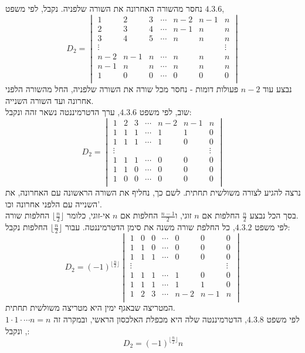 \documentclass{article}
\begin{document}
נחסר מהשורה האחרונה את השורה שלפניה. נקבל, לפי משפט $4.3.6$,
\[
    D_2 = \begin{vmatrix}
        1      & 2   & 3 & \cdots & n-2 & n-1 & n      \\
        2      & 3   & 4 & \cdots & n-1 & n   & n      \\
        3      & 4   & 5 & \cdots & n   & n   & n      \\
        \vdots &     &   &        &     &     & \vdots \\
        n-2    & n-1 & n & \cdots & n   & n   & n      \\
        n-1    & n   & n & \cdots & n   & n   & n      \\
        1      & 0   & 0 & \cdots & 0   & 0   & 0      \\
    \end{vmatrix}
\]
נבצע עוד $n-2$
פעולות דומות - נחסר מכל שורה את השורה שלפניה,
החל מהשורה הלפני אחרונה ועד השורה השנייה. \\
שוב, לפי משפט $4.3.6$,
ערך הדטרמיננטה נשאר זהה ונקבל:
\[
    D_2 = \begin{vmatrix}
        1      & 2 & 3 & \cdots & n-2 & n-1 & n      \\
        1      & 1 & 1 & \cdots & 1   & 1   & 0      \\
        1      & 1 & 1 & \cdots & 1   & 0   & 0      \\
        \vdots &   &   &        &     &     & \vdots \\
        1      & 1 & 1 & \cdots & 0   & 0   & 0      \\
        1      & 1 & 0 & \cdots & 0   & 0   & 0      \\
        1      & 0 & 0 & \cdots & 0   & 0   & 0      \\
    \end{vmatrix}
\]
נרצה להגיע לצורה משולשית תחתית.
לשם כך, נחליף את השורה הראשונה עם האחרונה, את השנייה עם הלפני אחרונה וכו'. \\
בסך הכל נבצע $\frac n 2$ החלפות אם $n$ זוגי,
ו$\frac{n-1}{2}$ החלפות אם $n$ אי-זוגי,
כלומר $\lfloor \frac n 2 \rfloor$ החלפות שורה. \\
לפי משפט $4.3.2$,
כל החלפת שורה משנה את סימן הדטרמיננטה. עבור $\lfloor \frac n 2 \rfloor$
החלפות נקבל:
\[
    D_2 = (-1)^{\lfloor \frac n 2 \rfloor}\begin{vmatrix}
        1      & 0 & 0 & \cdots & 0   & 0   & 0      \\
        1      & 1 & 0 & \cdots & 0   & 0   & 0      \\
        1      & 1 & 1 & \cdots & 0   & 0   & 0      \\
        \vdots &   &   &        &     &     & \vdots \\
        1      & 1 & 1 & \cdots & 1   & 0   & 0      \\
        1      & 1 & 1 & \cdots & 1   & 1   & 0      \\
        1      & 2 & 3 & \cdots & n-2 & n-1 & n      \\
    \end{vmatrix}
\]
המטריצה שבאגף ימין היא מטריצה משולשית תחתית. \\
לפי משפט $4.3.8$,
הדטרמיננטה שלה היא מכפלת האלכסון הראשי, ובמקרה זה $1\cdot 1 \cdot \cdots n=n$,
ונקבל:
\[
    D_2 = (-1)^{\lfloor \frac n 2 \rfloor}n
\]
\end{document}
